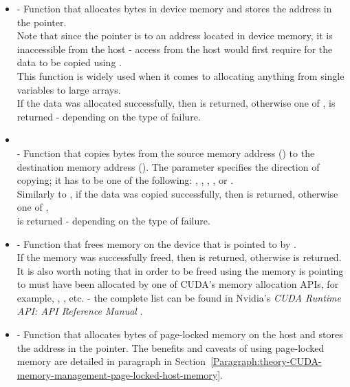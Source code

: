 \begin{itemize}
	\item {} - Function that allocates  bytes in device memory and stores the address in the  pointer. \\
	Note that since the pointer is to an address located in device memory, it is inaccessible from the host - access from the host would first require for the data to be copied using . \\
	This function is widely used when it comes to allocating anything from single variables to large arrays. \\
	If the data was allocated successfully, then  is returned, otherwise one of ,  is returned - depending on the type of failure.
	\item {}\\  - Function that copies  bytes from the source memory address () to the destination memory address (). The  parameter specifies the direction of copying; it has to be one of the following: , , , , or . \\
	Similarly to , if the data was copied successfully, then  is returned, otherwise one of , \\  is returned - depending on the type of failure.
	\item {} - Function that frees memory on the device that is pointed to by . \\
	If the memory was successfully freed, then  is returned, otherwise  is returned. \\
	It is also worth noting that in order to be freed using  the memory  is pointing to must have been allocated by one of CUDA's memory allocation APIs, for example, , , etc. - the complete list can be found in Nvidia's \emph{CUDA Runtime API: API Reference Manual} \cite{NvidiaJanuary2022}.
	\item {} - Function that allocates  bytes of page-locked memory on the host and stores the address in the  pointer. The benefits and caveats of using page-locked memory are detailed in paragraph \textit{} in Section~\ref{Paragraph:theory-CUDA-memory-management-page-locked-host-memory}.
\end{itemize}

